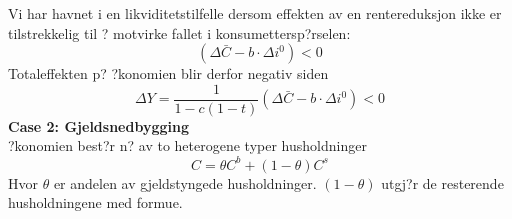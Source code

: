 \documentclass[a4paper,notitlepage]{article}
\begin{document}
Vi har havnet i en likviditetstilfelle dersom effekten av en rentereduksjon ikke er tilstrekkelig til ? motvirke fallet i konsumettersp?rselen:
\begin{equation*}
(\Delta\bar{C}-b\cdot \Delta i^{0})<0
\end{equation*}
Totaleffekten p? ?konomien blir derfor negativ siden
\begin{equation*}
\Delta Y=\frac{1}{1-c(1-t)}(\Delta\bar{C}-b\cdot \Delta i ^{0})<0
\end{equation*}
\noindent \textbf{Case 2: Gjeldsnedbygging \cite{eggertsson2012debt}}\\

\noindent ?konomien best?r n? av to heterogene typer husholdninger
\begin{equation*}
C=\theta C^{b}+(1-\theta)C^{s}
\end{equation*}
Hvor $\theta$ er andelen av gjeldstyngede husholdninger. $(1-\theta)$ utgj?r de resterende husholdningene med formue.
\end{document}
